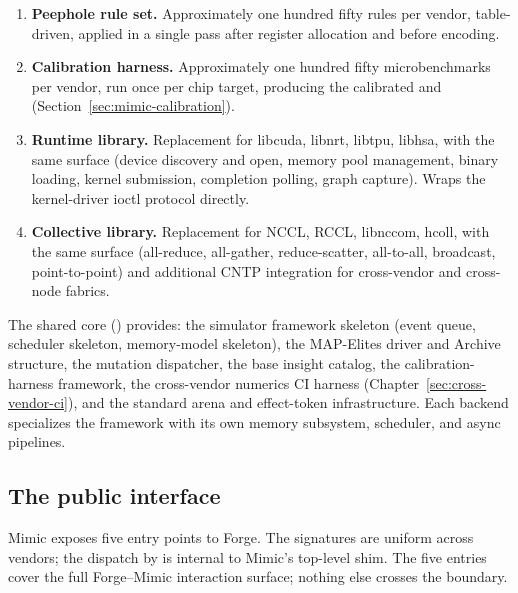 \begin{enumerate}
        Mutation operators are similarly factored into vendor-agnostic and vendor-specific.
  \item \textbf{Peephole rule set.}
        Approximately one hundred fifty rules per vendor, table-driven, applied in a single pass after register allocation and before encoding.
  \item \textbf{Calibration harness.}
        Approximately one hundred fifty microbenchmarks per vendor, run once per chip target, producing the calibrated  and  (Section~\ref{sec:mimic-calibration}).
  \item \textbf{Runtime library.}
        Replacement for libcuda, libnrt, libtpu, libhsa, with the same surface (device discovery and open, memory pool management, binary loading, kernel submission, completion polling, graph capture).
        Wraps the kernel-driver ioctl protocol directly.
  \item \textbf{Collective library.}
        Replacement for NCCL, RCCL, libnccom, hcoll, with the same surface (all-reduce, all-gather, reduce-scatter, all-to-all, broadcast, point-to-point) and additional CNTP integration for cross-vendor and cross-node fabrics.
\end{enumerate}

The shared core () provides: the simulator framework skeleton (event queue, scheduler skeleton, memory-model skeleton), the MAP-Elites driver and Archive structure, the mutation dispatcher, the base insight catalog, the calibration-harness framework, the cross-vendor numerics CI harness (Chapter~\ref{sec:cross-vendor-ci}), and the standard arena and effect-token infrastructure.
Each backend specializes the framework with its own memory subsystem, scheduler, and async pipelines.

\subsection{The public interface}
\label{sec:mimic-public-interface}

Mimic exposes five entry points to Forge.
The signatures are uniform across vendors; the dispatch by  is internal to Mimic's top-level shim.
The five entries cover the full Forge--Mimic interaction surface; nothing else crosses the boundary.

